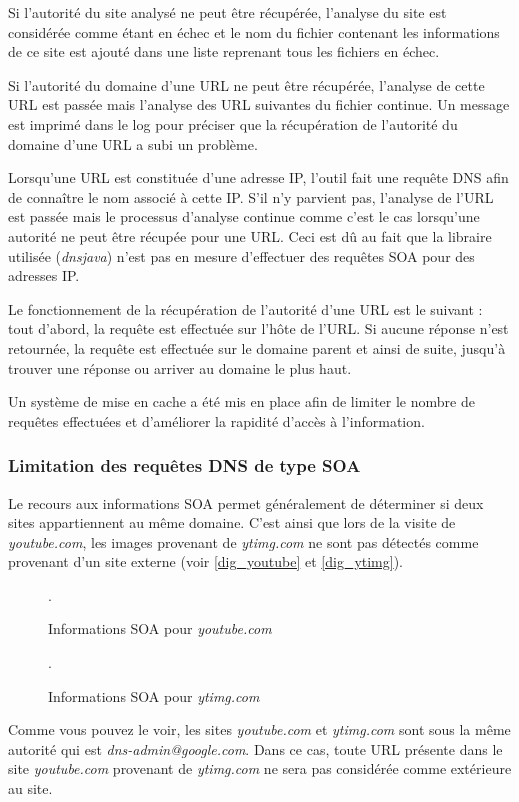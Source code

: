Si l'autorité du site analysé ne peut être récupérée, l'analyse du site est considérée comme étant en échec et le nom du fichier contenant les informations de ce site est ajouté dans une liste reprenant tous les fichiers en échec.

Si l'autorité du domaine d'une URL ne peut être récupérée, l'analyse de cette URL est passée mais l'analyse des URL suivantes du fichier continue. Un message est imprimé dans le log pour préciser que la récupération de l'autorité du domaine d'une URL a subi un problème.

Lorsqu'une URL est constituée d'une adresse IP, l'outil fait une requête DNS afin de connaître le nom associé à cette IP. S'il n'y parvient pas, l'analyse de l'URL est passée mais le processus d'analyse continue comme c'est le cas lorsqu'une autorité ne peut être récupée pour une URL. Ceci est dû au fait que la libraire utilisée (\textit{dnsjava}) n'est pas en mesure d'effectuer des requêtes SOA pour des adresses IP.

Le fonctionnement de la récupération de l'autorité d'une URL est le suivant : tout d'abord, la requête est effectuée sur l'hôte de l'URL. Si aucune réponse n'est retournée, la requête est effectuée sur le domaine parent et ainsi de suite, jusqu'à trouver une réponse ou arriver au domaine le plus haut.

Un système de mise en cache a été mis en place afin de limiter le nombre de requêtes effectuées et d'améliorer la rapidité d'accès à l'information.

\subsubsection{Limitation des requêtes DNS de type SOA}
Le recours aux informations SOA permet généralement de déterminer si deux sites appartiennent au même domaine. C'est ainsi que lors de la visite de \textit{youtube.com}, les images provenant de \textit{ytimg.com} ne sont pas détectés comme provenant d'un site externe (voir \autoref{dig_youtube} et \autoref{dig_ytimg}).

\begin{figure}[h]
	\centering
	
	\caption{\label{dig_youtube}Informations SOA pour \textit{youtube.com}}.
\end{figure}

\begin{figure}[h]
	\centering
	
	\caption{\label{dig_ytimg}Informations SOA pour \textit{ytimg.com}}.
\end{figure}
Comme vous pouvez le voir, les sites \textit{youtube.com} et \textit{ytimg.com} sont sous la même autorité qui est \textit{dns-admin@google.com}. Dans ce cas, toute URL présente dans le site \textit{youtube.com} provenant de \textit{ytimg.com} ne sera pas considérée comme extérieure au site.
\newline

